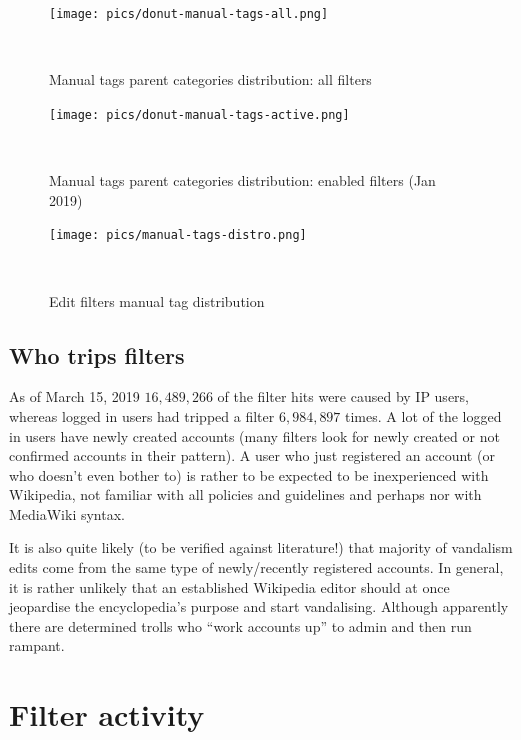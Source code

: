 \begin{figure}
\centering
  \texttt{[image: pics/donut-manual-tags-all.png]}
  \caption{Manual tags parent categories distribution: all filters}~\label{fig:manual-tags-all}
\end{figure}

\begin{figure}
\centering
  \texttt{[image: pics/donut-manual-tags-active.png]}
    \caption{Manual tags parent categories distribution: enabled filters (Jan 2019)}~\label{fig:manual-tags-active}
\end{figure}

\begin{landscape}
\begin{figure}
\centering
  \texttt{[image: pics/manual-tags-distro.png]}
  \caption{Edit filters manual tag distribution}~\label{fig:manual-tags}
\end{figure}
\end{landscape}


\subsection{Who trips filters}

As of March 15, 2019 $16,489,266$ of the filter hits were caused by IP users, whereas logged in users had tripped a filter $6,984,897$ times.
A lot of the logged in users have newly created accounts (many filters look for newly created or not confirmed accounts in their pattern). %
A user who just registered an account (or who doesn't even bother to) is rather to be expected to be inexperienced with Wikipedia, not familiar with all policies and guidelines and perhaps nor with MediaWiki syntax.

It is also quite likely (to be verified against literature!) that majority of vandalism edits come from the same type of newly/recently registered accounts.
In general, it is rather unlikely that an established Wikipedia editor should at once jeopardise the encyclopedia's purpose and start vandalising.
Although apparently there are determined trolls who ``work accounts up'' to admin and then run rampant.


\section{Filter activity}
\label{sec:filter-activity}

